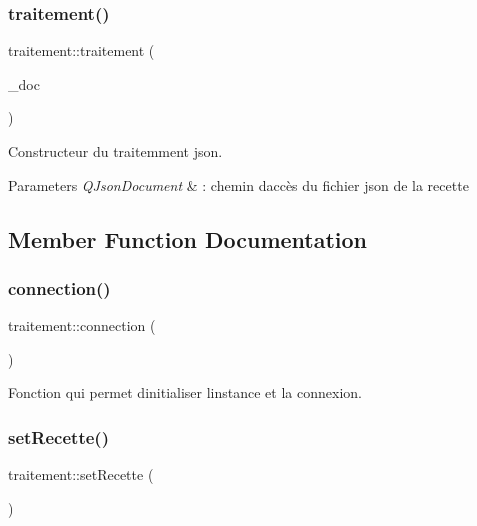 \subsubsection{\texorpdfstring{traitement()}{traitement()}}
{\footnotesize\ttfamily traitement\+::traitement (\begin{DoxyParamCaption}\item[{Q\+Json\+Document}]{\+\_\+doc }\end{DoxyParamCaption})}



Constructeur du traitemment json. 


\begin{DoxyParams}{Parameters}
{\em Q\+Json\+Document} & \+: chemin d\textquotesingle{}accès du fichier json de la recette \\
\hline
\end{DoxyParams}


\subsection{Member Function Documentation}
\mbox{\label{classtraitement_a2ce2b64928d33b331a8f67857ca22e74}} 
\subsubsection{\texorpdfstring{connection()}{connection()}}
{\footnotesize\ttfamily traitement\+::connection (\begin{DoxyParamCaption}{ }\end{DoxyParamCaption})}



Fonction qui permet d\textquotesingle{}initialiser l\textquotesingle{}instance et la connexion. 

\mbox{\label{classtraitement_a2a9559686027b1ac30fdce7c62cb1172}} 
\subsubsection{\texorpdfstring{set\+Recette()}{setRecette()}}
{\footnotesize\ttfamily traitement\+::set\+Recette (\begin{DoxyParamCaption}{ }\end{DoxyParamCaption})}




